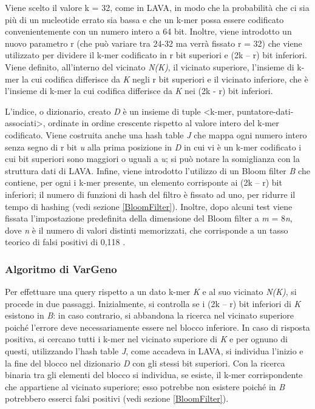 \documentclass[../main.tex]{subfiles}
\begin{document}
Viene scelto il valore k = 32, come in LAVA, in modo che la probabilità che ci sia più di un nucleotide errato sia bassa e che un k-mer possa essere codificato convenientemente con un numero intero a 64 bit. Inoltre, viene introdotto un nuovo parametro r (che può variare tra 24-32 ma verrà fissato r = 32) che viene utilizzato per dividere il k-mer codificato in r bit superiori e (2k – r) bit inferiori. Viene definito, all’interno del vicinato \textit{N(K)}, il vicinato superiore, l'insieme di k-mer la cui codifica differisce da \textit{K} negli r bit superiori e il vicinato inferiore, che è l'insieme di k-mer la cui codifica differisce da \textit{K} nei (2k - r) bit inferiori.

L’indice, o dizionario, creato \textit{D} è un insieme di tuple <k-mer, puntatore-dati-associati>, ordinate in ordine crescente rispetto al valore intero del k-mer codificato. Viene costruita anche una hash table \textit{J} che mappa ogni numero intero senza segno di r bit \textit{u} alla prima posizione in \textit{D} in cui vi è un k-mer codificato i cui bit superiori sono maggiori o uguali a \textit{u}; si può notare la somiglianza con la struttura dati di LAVA. Infine, viene introdotto l'utilizzo di un Bloom filter \textit{B} che contiene, per ogni i k-mer presente, un elemento corrisponte ai (2k – r) bit inferiori; il numero di funzioni di hash del filtro è fissato ad uno, per ridurre il tempo di hashing (vedi sezione \ref{BloomFilter}). Inoltre, dopo alcuni test viene fissata l'impostazione predefinita della dimensione del Bloom filter a \textit{m} = 8\textit{n}, dove \textit{n} è il numero di valori distinti memorizzati, che corrisponde a un tasso teorico di falsi positivi di 0,118 \cite{sun-medvedev2018vargeno}.

\subsubsection{Algoritmo di VarGeno}

Per effettuare una query rispetto a un dato k-mer \textit{K} e al suo vicinato \textit{N(K)}, si procede in due passaggi. Inizialmente, si controlla se i (2k – r) bit inferiori di \textit{K} esistono in \textit{B}: in caso contrario, si abbandona la ricerca nel vicinato superiore poiché l’errore deve necessariamente essere nel blocco inferiore. In caso di risposta positiva, si cercano tutti i k-mer nel vicinato superiore di \textit{K} e per ognuno di questi, utilizzando l’hash table \textit{J}, come accadeva in LAVA, si individua l’inizio e la fine del blocco nel dizionario \textit{D} con gli stessi bit superiori. Con la ricerca binaria tra gli elementi del blocco si individua, se esiste, il k-mer corrispondente che appartiene al vicinato superiore; esso potrebbe non esistere poiché in \textit{B} potrebbero esserci falsi positivi (vedi sezione \ref{BloomFilter}).
\end{document}
